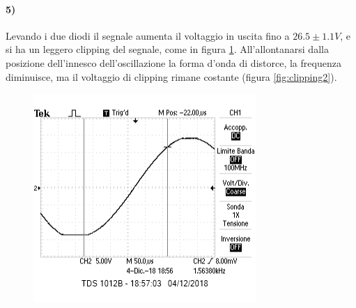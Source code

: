 \documentclass{article}
\begin{document}
\paragraph{5)}
	Levando i due diodi il segnale aumenta il voltaggio in uscita fino a $26.5\pm1.1 V$, e si ha un leggero clipping del segnale, come in figura \ref{fig:clipping1}.\newline
	All'allontanarsi dalla posizione dell'innesco dell'oscillazione la forma d'onda di distorce, la frequenza diminuisce, ma il voltaggio di clipping rimane costante (figura \ref{fig:clipping2}).
	\begin{figure}[htb]
	    \begin{minipage}[t]{.5\linewidth}
	        \centering
			\includegraphics[width=\linewidth]{figure/clipping1.png}
			\label{fig:clipping1}
	    \end{minipage}
	    \begin{minipage}[t]{.5\linewidth}
	        \centering

\end{minipage}
\end{figure}
\end{document}
